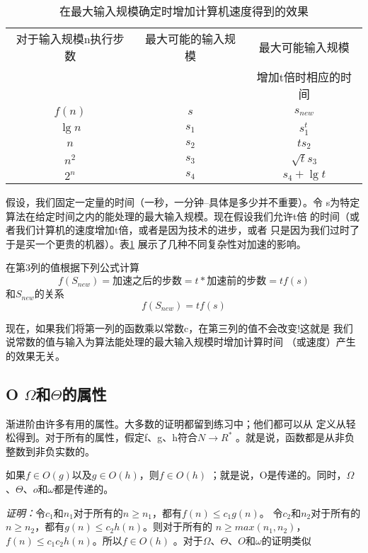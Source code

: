 \begin{table}
\centering
\begin{tabular}{ccc}
    \hline
    对于输入规模n执行步数 & 最大可能的输入规模  &最大可能输入规模\\
    &  &增加t倍时相应的时间\\
    $f(n)$  &$s$  &$s_{new}$\\
    \hline
    $\lg n$  & $s_1$  & $s_1^t$\\
    $n$      & $s_2$  & $ts_2$\\
    $n^2$    & $s_3$  & $\sqrt{t}s_3$\\
    $2^n$    & $s_4$  & $s_4+\lg t$\\
    \hline
\end{tabular}
\caption{在最大输入规模确定时增加计算机速度得到的效果}
\label{Table:EffectOfUseFasterComputer}
\end{table}

假设，我们固定一定量的时间（一秒，一分钟--具体是多少并不重要）。令
s为特定算法在给定时间之内的能处理的最大输入规模。现在假设我们允许t倍
的时间（或者我们计算机的速度增加t倍，或者是因为技术的进步，或者
只是因为我们过时了于是买一个更贵的机器）。表\ref{Table:EffectOfUseFasterComputer}
展示了几种不同复杂性对加速的影响。

在第3列的值根据下列公式计算
\begin{displaymath}
f(S_{new})=\mbox{加速之后的步数}=t*\mbox{加速前的步数}=tf(s)
\end{displaymath}
\noindent
和$S_{new}$的关系
\begin{displaymath}
f(S_{new})=tf(s)
\end{displaymath}

现在，如果我们将第一列的函数乘以常数c，在第三列的值不会改变!这就是
我们说常数的值与输入为算法能处理的最大输入规模时增加计算时间
（或速度）产生的效果无关。


\subsection{O $\Omega$和$\Theta$的属性}
渐进阶由许多有用的属性。大多数的证明都留到练习中；他们都可以从
定义从轻松得到。对于所有的属性，假定f、g、h符合$N \rightarrow R^*$
。就是说，函数都是从非负整数到非负实数的。

\begin{lemma}
如果$f\in O(g)$以及$g \in O(h)$，则$f\in O(h)$
；就是说，Ο是传递的。同时，$\Omega$、$\Theta$、$o$和$\omega$都是传递的。

\emph{证明：}令$c_1$和$n_1$对于所有的$n \geq n_1$，都有$f(n)\leq c_1g(n)$。
令$c_2$和$n_2$对于所有的$n\geq n_2$，都有$g(n)\leq c_2h(n)$。则对于所有的
$n\geq max(n_1, n_2)$，$f(n)\leq c_1c_2h(n)$。所以$f\in O(h)$
。对于$\Omega$、$\Theta$、$O$和$\omega$的证明类似
\end{lemma}

